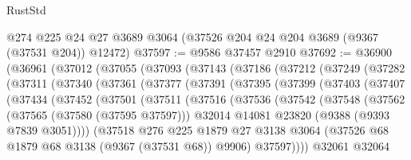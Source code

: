 \begin{lexlean}{RustStd}
\begin{coremodule}
    @274
    @225
    @24
    @27
    @3689
    @3064
    (@37526 @204 @24 @204 @3689 (@9367 (@37531 @204)) @12472)
@37597 := @9586 @37457 @2910
@37692 := @36900
    (@36961
      (@37012
        (@37055
          (@37093
            (@37143
              (@37186
                (@37212
                  (@37249
                    (@37282
                      (@37311
                        (@37340
                          (@37361
                            (@37377
                              (@37391
                                (@37395
                                  (@37399
                                    (@37403
                                      (@37407
                                        (@37434
                                          (@37452
                                            (@37501
                                              (@37511
                                                (@37516
                                                  (@37536
                                                    (@37542
                                                      (@37548
                                                        (@37562
                                                          (@37565 (@37580 (@37595 @37597)))
                                                          @32014
                                                          @14081
                                                          @23820
                                                          (@9388 (@9393 @7839 @3051))))
                                                      (@37518
                                                        @276
                                                        @225
                                                        @1879
                                                        @27
                                                        @3138
                                                        @3064
                                                        (@37526
                                                          @68
                                                          @1879
                                                          @68
                                                          @3138
                                                          (@9367 (@37531 @68))
                                                          @9906)
                                                        @37597))))
                                                @32061
                                                @32064

\end{coremodule}
\end{lexlean}
